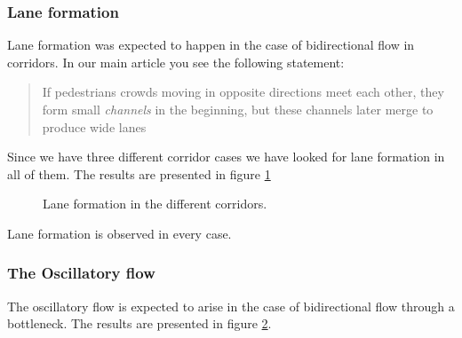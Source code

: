 \subsubsection{Lane formation}
Lane formation was expected to happen in the case of bidirectional 
flow in corridors. In our main article you see the following statement:

\begin{quote}
If pedestrians crowds moving in opposite directions meet each other, 
they form small \emph{channels} in the beginning, but these channels 
later merge to produce wide lanes
\end{quote}

Since we have three different corridor cases we have 
looked for lane formation in all of them. The results are presented in 
figure \ref{fig:laneformation}

\begin{figure}[h]
\centering
\subfloat[]{\resizebox{5cm}{!}{}}
\subfloat[]{\resizebox{5cm}{!}{}}
\subfloat[]{\resizebox{5cm}{!}{}}
\caption{Lane formation in the different corridors.}
\label{fig:laneformation}
\end{figure}

Lane formation is observed in every case.

\subsubsection{The Oscillatory flow}
The oscillatory flow is expected to arise in the case of bidirectional 
flow through a bottleneck. The results are presented in figure
\ref{fig:oscillitoryflow}.

\begin{figure}[h]
\centering
{}
\caption{}
\label{fig:oscillitoryflow}
\end{figure}

